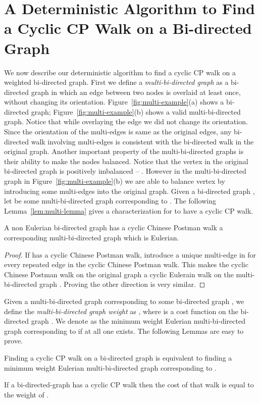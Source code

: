 \documentclass[runningheads]{llncs}
\begin{document}
\section{A Deterministic Algorithm to Find a Cyclic CP Walk on a Bi-directed Graph}
\label{sec:det_algo}
We now describe our deterministic algorithm to find a cyclic CP walk on a weighted bi-directed 
graph. First we define a {\em multi-bi-directed graph} as a bi-directed graph in which an edge between two
nodes is overlaid at least once, without changing its orientation. Figure~\ref{fig:multi-example}(a)
shows a bi-directed graph; Figure~\ref{fig:multi-example}(b) shows a valid multi-bi-directed graph. Notice
that while overlaying the edge we did not change its orientation. Since the orientation of the multi-edges
is same as the original edges, any bi-directed walk involving multi-edges is consistent with the bi-directed
walk in the original graph. Another important property of the multi-bi-directed graphs is their ability to make
the nodes balanced. Notice that the vertex  in the original bi-directed graph is positively imbalanced --
. However in the multi-bi-directed graph in Figure~\ref{fig:multi-example}(b)
we are able to balance vertex  by introducing some multi-edges into the original graph. Given a bi-directed
graph , let  be some multi-bi-directed graph corresponding to . The following 
Lemma~\ref{lem:multi-lemma} gives a characterization for  to have a cyclic CP walk. 
\begin{lemma}
\label{lem:multi-lemma}
A non Eulerian bi-directed graph  has a cyclic Chinese Postman walk  a corresponding 
multi-bi-directed graph  which is Eulerian.
\end{lemma}
\begin{proof}
If  has a cyclic Chinese Postman walk, introduce a unique multi-edge in  for every repeated edge in the 
cyclic Chinese Postman walk. This makes the cyclic Chinese Postman walk on the original graph a cyclic Eulerain walk on the
multi-bi-directed graph . Proving the other direction is very similar. 
\end{proof}

Given a multi-bi-directed graph  corresponding to some bi-directed graph , we define the 
{\em multi-bi-directed graph weight} as , where 
is a cost function on the bi-directed graph .  We denote  as the minimum weight Eulerian multi-bi-directed graph 
corresponding to  if at all one exists. The following Lemmas are easy to prove.
\begin{lemma}
\label{lem:reformulate}
Finding a cyclic CP walk on a bi-directed graph  is equivalent to finding a minimum weight Eulerian multi-bi-directed graph  corresponding to . 
\end{lemma}
\begin{lemma}
\label{lem:cost}
If a bi-directed-graph  has a cyclic CP walk then the cost of that walk is equal to the weight of .
\end{lemma}
\end{document}
